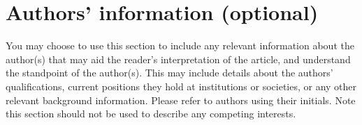 \documentclass[a4paper,num-refs]{oup-contemporary}
\begin{document}
\section{Authors' information (optional)}

You may choose to use this section to include any relevant information about the author(s) that may aid the reader's interpretation of the article, and understand the standpoint of the author(s). This may include details about the authors' qualifications, current positions they hold at institutions or societies, or any other relevant background information. Please refer to authors using their initials. Note this section should not be used to describe any competing interests.




\end{document}
